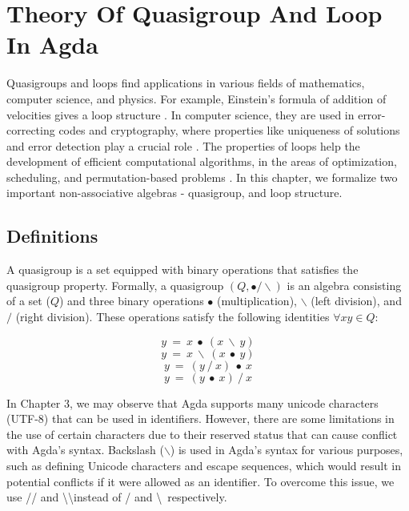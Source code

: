 \chapter{Theory Of Quasigroup And Loop In Agda}
Quasigroups and loops find applications in various fields of mathematics,
computer science, and physics. For example, Einstein's formula of addition of
velocities gives a loop structure \cite{ungar2007einstein}. In computer science,
they are used in error-correcting codes and cryptography, where properties like
uniqueness of solutions and error detection play a crucial role
\cite{phillips2010automated}. The properties of loops help the development of
efficient computational algorithms, in the areas of optimization, scheduling,
and permutation-based problems \cite{khan2015mining}. In this chapter, we
formalize two important non-associative algebras - quasigroup, and loop
structure.
 
\section{Definitions}
A quasigroup is a set equipped with binary operations that satisfies the
quasigroup property. Formally, a quasigroup $(Q,∙/\backslash)$ is an algebra
consisting of a set ($Q$) and three binary operations $∙$ (multiplication),
$\backslash$ (left division), and $/$ (right division). These operations satisfy
the following identities $\forall x y \in Q$:

\begin{equation} \label{eq_L-leftdivides}
y\ =\ x\ ∙\ (x\ \backslash\ y)
\end{equation}
\begin{equation} \label{eq_L-rightdivides}
y\ =\ x\ \backslash\ (x\ ∙\ y)
\end{equation}
\begin{equation} \label{eq_R-leftdivides}
y\ =\ (y\ /\ x)\ ∙\ x
\end{equation}
\begin{equation} \label{eq_Rirightdivides}
y\ =\ (y\ ∙\ x)\ /\ x
\end{equation}

In Chapter 3, we may observe that Agda supports many unicode characters (UTF-8)
that can be used in identifiers. However, there are some limitations in the use
of certain characters due to their reserved status that can cause conflict with
Agda's syntax. Backslash ($\backslash$) is used in Agda's syntax for various
purposes, such as defining Unicode characters and escape sequences, which would
result in potential conflicts if it were allowed as an identifier. To overcome
this issue, we use // and \textbackslash\textbackslash instead of / and
\textbackslash \ respectively.

